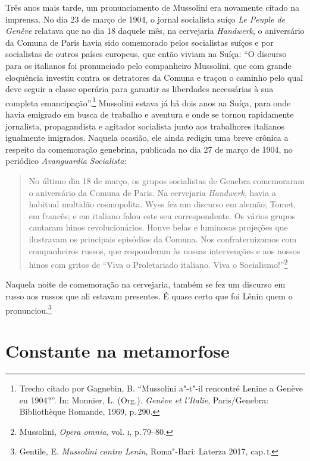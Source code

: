 Três anos mais tarde, um pronunciamento de Mussolini era novamente
citado na imprensa. No dia 23 de março de 1904, o jornal socialista
suíço \emph{Le Peuple de Genève} relatava que no dia 18 daquele mês, na
cervejaria \emph{Handwerk}, o aniversário da Comuna de Paris havia sido
comemorado pelos socialistas suíços e por socialistas de outros países
europeus, que então viviam na Suíça: ``O discurso para os italianos foi
pronunciado pelo companheiro Mussolini, que com grande eloquência
investiu contra os detratores da Comuna e traçou o caminho pelo qual
deve seguir a classe operária para garantir as liberdades necessárias à
sua completa emancipação''.\footnote{Trecho citado por Gagnebin, B.
  ``Mussolini a"-t"-il rencontré Lenine a Genève en 1904?''. In: Monnier,
  L. (Org.). \emph{Genève et l'Italie}, Paris/Genebra: Bibliothèque
  Romande, 1969, p.\,290.} Mussolini estava já há dois anos na Suíça,
para onde havia emigrado em busca de trabalho e aventura e onde se
tornou rapidamente jornalista, propagandista e agitador socialista junto
aos trabalhores italianos igualmente imigrados. Naquela ocasião, ele
ainda redigiu uma breve crônica a respeito da comemoração genebrina,
publicada no dia 27 de março de 1904, no periódico \emph{Avanguardia
Socialista}:

\begin{quote}
No último dia 18 de março, os grupos socialistas de Genebra comemoraram
o aniversário da Comuna de Paris. Na cervejaria \emph{Handwerk}, havia a
habitual multidão cosmopolita. Wyss fez um discurso em alemão; Tomet, em
francês; e em italiano falou este seu correspondente. Os vários grupos
cantaram hinos revolucionários. Houve belas e luminosas projeções que
ilustravam os principais episódios da Comuna. Nos confraternizamos com
companheiros russos, que responderam às nossas intervenções e aos nossos
hinos com gritos de ``Viva o Proletariado italiano. Viva o
Socialismo!''\footnote{Mussolini, \emph{Opera omnia,} vol. \textsc{i}, p.\,79--80.}
\end{quote}

Naquela noite de comemoração na cervejaria, também se fez um discurso em
russo aos russos que ali estavam presentes. É quase certo que foi Lênin
quem o pronunciou.\footnote{Gentile, E. \emph{Mussolini contro Lenin},
  Roma"-Bari: Laterza 2017, cap.\,\textsc{i}.}

\section{Constante na metamorfose}

